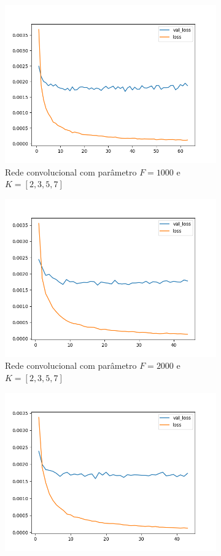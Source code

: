 \begin{figure}[H]
\begin{subfigure}{.5\textwidth}
  \centering
  \includegraphics[width=.8\linewidth]{figuras/ape-ajustes-hiper-parametros/cnn-1000.png}
  \caption{Rede convolucional com parâmetro $F = 1000$ e $K = [2,3,5,7]$}
  \label{fig:cnn-1000}
\end{subfigure}%
\begin{subfigure}{.5\textwidth}
  \centering
  \includegraphics[width=.8\linewidth]{figuras/ape-ajustes-hiper-parametros/cnn-2000.png}
  \caption{Rede convolucional com parâmetro $F = 2000$ e $K = [2, 3, 5, 7]$}
  \label{fig:cnn-2000}
\end{subfigure}
\begin{subfigure}{.5\textwidth}
  \centering
  \includegraphics[width=.8\linewidth]{figuras/ape-ajustes-hiper-parametros/cnn-4000.png}

\end{subfigure}
\end{figure}
